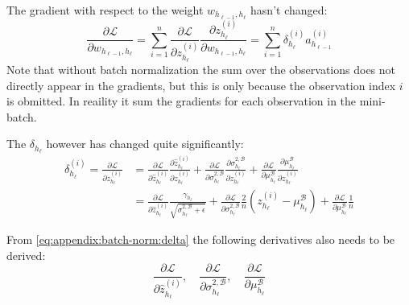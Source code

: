 The gradient with respect to the weight $w_{h_{\ell-1},h_\ell}$ hasn't changed:
\begin{equation}
\frac{\partial \mathcal{L}}{\partial w_{h_{\ell-1},h_\ell}} = \sum_{i=1}^n \frac{\partial \mathcal{L}}{\partial z_{h_\ell}^{(i)}} \frac{\partial z_{h_\ell}^{(i)}}{\partial w_{h_{\ell-1},h_\ell}} =\sum_{i=1}^n \delta_{h_\ell}^{(i)} a_{h_{\ell-1}}^{(i)}
\end{equation}
Note that without batch normalization the sum over the observations does not directly appear in the gradients, but this is only because the observation index $i$ is obmitted. In reaility it sum the gradients for each observation in the mini-batch.

The $\delta_{h_\ell}$ however has changed quite significantly:
\begin{equation}
\begin{aligned}
\delta_{h_\ell}^{(i)} = \frac{\partial \mathcal{L}}{\partial z_{h_\ell}^{(i)}} &= \frac{\partial \mathcal{L}}{\partial \hat{z}_{h_\ell}^{(i)}} \frac{\partial \hat{z}_{h_\ell}^{(i)}}{\partial z_{h_\ell}^{(i)}} + \frac{\partial \mathcal{L}}{\partial \sigma_{h_\ell}^{2,\mathcal{B}}} \frac{\partial \sigma_{h_\ell}^{2,\mathcal{B}}}{\partial z_{h_\ell}^{(i)}} + \frac{\partial \mathcal{L}}{\partial \mu_{h_\ell}^{\mathcal{B}}} \frac{\partial \mu_{h_\ell}^{\mathcal{B}}}{\partial z_{h_\ell}^{(i)}} \\
&= \frac{\partial \mathcal{L}}{\partial \hat{z}_{h_\ell}^{(i)}} \frac{\gamma_{h_\ell}}{\sqrt{\sigma_{h_\ell}^{2, \mathcal{B}} + \epsilon}} + \frac{\partial \mathcal{L}}{\partial \sigma_{h_\ell}^{2,\mathcal{B}}} \frac{2}{n}\left(z_{h_\ell}^{(i)} - \mu_{h_\ell}^{\mathcal{B}}\right) + \frac{\partial \mathcal{L}}{\partial \mu_{h_\ell}^{\mathcal{B}}} \frac{1}{n}
\end{aligned}
\label{eq:appendix:batch-norm:delta}
\end{equation}

From \eqref{eq:appendix:batch-norm:delta} the following derivatives also needs to be derived:
\begin{equation}
\frac{\partial \mathcal{L}}{\partial \hat{z}_{h_\ell}^{(i)}}, \quad \frac{\partial \mathcal{L}}{\partial \sigma_{h_\ell}^{2,\mathcal{B}}}, \quad \frac{\partial \mathcal{L}}{\partial \mu_{h_\ell}^{\mathcal{B}}}
\end{equation}

